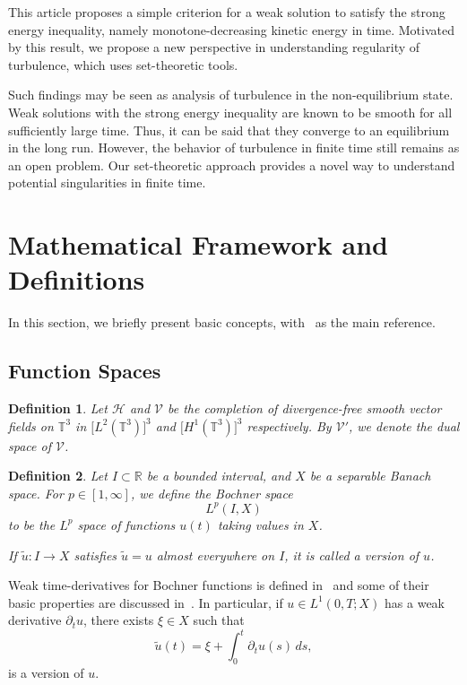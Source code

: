 \documentclass{article}
\newtheorem{definition}{Definition}
\def\T{{\mathbb{T}}}
\def\H{{\mathcal{H}}}
\def\V{{\mathcal{V}}}
\begin{document}
This article proposes a simple criterion for a weak solution to satisfy the
strong energy inequality, namely monotone-decreasing kinetic energy in time. Motivated by this result, we propose a new perspective in understanding regularity of turbulence, which uses set-theoretic tools. 

Such findings may be seen as analysis of turbulence in the non-equilibrium
state. Weak solutions with the strong energy inequality are known to be smooth for all sufficiently large time. Thus, it can be said that they converge to an equilibrium in the long run. However, the behavior of turbulence in finite time still remains as an open problem. Our set-theoretic approach provides a novel way to understand potential singularities in finite time.


\section{Mathematical Framework and Definitions}
\label{sec:def}

In this section, we briefly present basic concepts, with~\cite{RobRodSad16} as the main reference. 
\subsection{Function Spaces}
\label{sec:hilb}

\begin{definition}
    Let $\H$ and $\V$ be the completion of divergence-free smooth vector fields on $\mathbb{T}^3$ in $\bigl[ L^2(\T^3) \bigr]^3$ and $\bigl[ H^1(\T^3) \bigr]^3$ respectively. By $\V'$, we denote the dual space of $\V$.
\end{definition}





\begin{definition}
    Let $I\subset \mathbb{R}$ be a bounded interval, and $X$ be a separable Banach space. For $p \in [1,\infty]$, we define the Bochner space
\begin{equation}
  \label{eq:bochner}
  L^p(I, X)
\end{equation}
to be the $L^p$ space of functions $u(t)$ taking values in $X$. 

If $\tilde u : I \to X$ satisfies $\tilde u = u$ almost everywhere on $I$, it is called a version of $u$.

\end{definition}


Weak time-derivatives for Bochner functions is defined in~\cite[Definition 1.30]{RobRodSad16} and some of their basic properties are discussed in~\cite[Lemma 1.31]{RobRodSad16}. In particular, if $u \in L^1(0,T ; X)$ has a weak derivative
$\partial_t u$, there exists $\xi \in X$ such that 
\begin{equation}
  \label{eq:cont}
  \tilde u(t) = \xi + \int_0^t\partial_t u(s)\,ds,
\end{equation}
is a version of $u$. 
\end{document}
